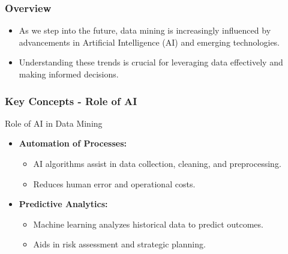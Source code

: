 \documentclass[aspectratio=169]{beamer}
\begin{document}
\frame{\titlepage}

\begin{frame}[fragile]
    \titlepage
\end{frame}

\begin{frame}[fragile]
    \frametitle{Overview}
    \begin{itemize}
        \item As we step into the future, data mining is increasingly influenced by advancements in Artificial Intelligence (AI) and emerging technologies.
        \item Understanding these trends is crucial for leveraging data effectively and making informed decisions.
    \end{itemize}
\end{frame}

\begin{frame}[fragile]
    \frametitle{Key Concepts - Role of AI}
    \begin{block}{Role of AI in Data Mining}
        \begin{itemize}
            \item \textbf{Automation of Processes:} 
                \begin{itemize}
                    \item AI algorithms assist in data collection, cleaning, and preprocessing.
                    \item Reduces human error and operational costs.
                \end{itemize}
            \item \textbf{Predictive Analytics:} 
                \begin{itemize}
                    \item Machine learning analyzes historical data to predict outcomes.
                    \item Aids in risk assessment and strategic planning.
                \end{itemize}
        \end{itemize}
    \end{block}
\end{frame}
\end{document}
